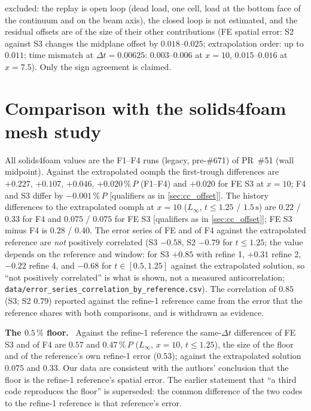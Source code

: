 \documentclass[sn-mathphys,Numbered]{sn-jnl}
\newcommand{\uref}{{\small[qualifiers as in \ref{sec:cc_offset}]}}
\newcommand{\legbc}{\textcolor{red!70!black}{(legacy, pre-\#671)}}
\renewcommand{\paragraph}[1]{\par\vspace{0.15\baselineskip}\noindent\textbf{#1}\ }
\begin{document}
excluded: the replay is open loop (dead load, one cell, load at the bottom face of the continuum and on the beam axis), the closed loop is not estimated, and the residual offsets are of the size of their other contributions (FE spatial error: S2 against S3 changes the midplane offset by $0.018$--$0.025$; extrapolation order: up to $0.011$; time mismatch at $\Delta t=0.00625$: $0.003$--$0.006$ at $x=10$, $0.015$--$0.016$ at $x=7.5$). Only the sign agreement is claimed.

\section{Comparison with the solids4foam mesh study}\label{sec:cc_s4f}
All solids4foam values are the F1--F4 runs \legbc{} of PR~\#51 (wall midpoint). Against the extrapolated oomph the first-trough differences are $+0.227$, $+0.107$, $+0.046$, $+0.020\,\%\,P$ (F1--F4) and $+0.020$ for FE S3 at $x=10$; F4 and S3 differ by $-0.001\,\%\,P$ \uref. The history differences to the extrapolated oomph at $x=10$ ($L_\infty$, $t\le1.25$ / $1.5\,\mathrm s$) are $0.22$ / $0.33$ for F4 and $0.075$ / $0.075$ for FE S3 \uref; FE S3 minus F4 is $0.28$ / $0.40$. The error series of FE and of F4 against the extrapolated reference are \emph{not} positively correlated (S3 $-0.58$, S2 $-0.79$ for $t\le1.25$; the value depends on the reference and window: for S3 $+0.85$ with refine 1, $+0.31$ refine 2, $-0.22$ refine 4, and $-0.68$ for $t\in[0.5,1.25]$ against the extrapolated solution, so ``not positively correlated'' is what is shown, not a measured anticorrelation; \texttt{data/error\_series\_correlation\_by\_reference.csv}). The correlation of $0.85$ (S3; S2 $0.79$) reported against the refine-1 reference came from the error that the reference shares with both comparisons, and is withdrawn as evidence.
\paragraph{The $0.5\,\%$ floor.}
Against the refine-1 reference the same-$\Delta t$ differences of FE S3 and of F4 are $0.57$ and $0.47\,\%\,P$ ($L_\infty$, $x=10$, $t\le1.25$), the size of the floor and of the reference's own refine-1 error ($0.53$); against the extrapolated solution $0.075$ and $0.33$. Our data are consistent with the authors' conclusion that the floor is the refine-1 reference's spatial error. The earlier statement that ``a third code reproduces the floor'' is superseded: the common difference of the two codes to the refine-1 reference is that reference's error.
\end{document}
